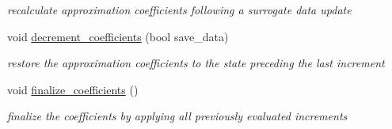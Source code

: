 \begin{DoxyCompactItemize}
\begin{DoxyCompactList}\small\item\em recalculate approximation coefficients following a surrogate data update \end{DoxyCompactList}\item 
void \hyperlink{classPecos_1_1ProjectOrthogPolyApproximation_a662fd880fee0ed53f1e3383c41d6b792}{decrement\+\_\+coefficients} (bool save\+\_\+data)\label{classPecos_1_1ProjectOrthogPolyApproximation_a662fd880fee0ed53f1e3383c41d6b792}

\begin{DoxyCompactList}\small\item\em restore the approximation coefficients to the state preceding the last increment \end{DoxyCompactList}\item 
void \hyperlink{classPecos_1_1ProjectOrthogPolyApproximation_a742e0217d6f681e08f401409771f4f4a}{finalize\+\_\+coefficients} ()\label{classPecos_1_1ProjectOrthogPolyApproximation_a742e0217d6f681e08f401409771f4f4a}

\begin{DoxyCompactList}\small\item\em finalize the coefficients by applying all previously evaluated increments \end{DoxyCompactList}\end{DoxyCompactItemize}
